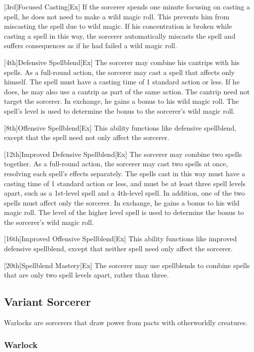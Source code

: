 [3rd]{Focused Casting}[Ex]
If the sorcerer spends one minute focusing on casting a spell, he does not need to make a wild magic roll.
This prevents him from miscasting the spell due to wild magic.
If his concentration is broken while casting a spell in this way, the sorcerer automatically miscasts the spell and suffers consequences as if he had failed a wild magic roll.

[4th]{Defensive Spellblend}[Ex]
The sorcerer may combine his cantrips with his spells.
As a full-round action, the sorcerer may cast a spell that affects only himself.
The spell must have a casting time of 1 standard action or less.
If he does, he may also use a cantrip as part of the same action.
The cantrip need not target the sorcerer.
In exchange, he gains a  bonus to his wild magic roll.
The spell's level is used to determine the bonus to the sorcerer's wild magic roll.

[8th]{Offensive Spellblend}[Ex]
This ability functions like defensive spellblend, except that the spell need not only affect the sorcerer.

[12th]{Improved Defensive Spellblend}[Ex]
The sorcerer may combine two spells together.
As a full-round action, the sorcerer may cast two spells at once, resolving each spell's effects separately.
The spells cast in this way must have a casting time of 1 standard action or less, and must be at least three spell levels apart, such as a 1st-level spell and a 4th-level spell.
In addition, one of the two spells must affect only the sorcerer.
In exchange, he gains a  bonus to his wild magic roll.
The level of the higher level spell is used to determine the bonus to the sorcerer's wild magic roll.

[16th]{Improved Offensive Spellblend}[Ex]
This ability functions like improved defensive spellblend, except that neither spell need only affect the sorcerer.

[20th]{Spellblend Mastery}[Ex]
The sorcerer may use spellblends to combine spells that are only two spell levels apart, rather than three.

\subsection{Variant Sorcerer}

Warlocks are sorcerers that draw power from pacts with otherworldly creatures.

\subsubsection{Warlock}

